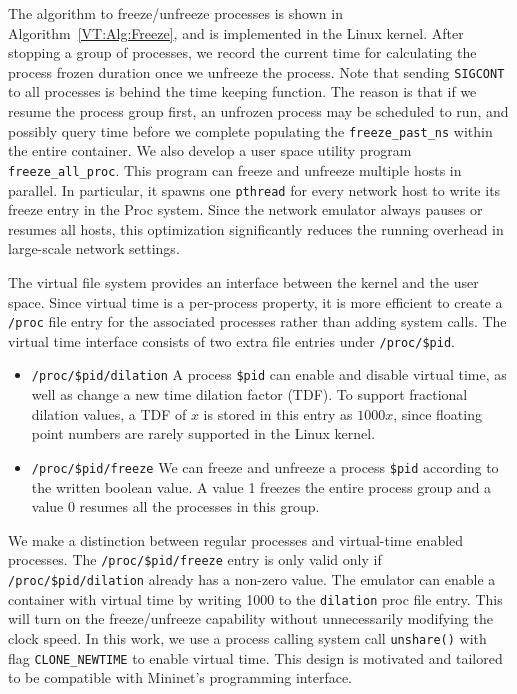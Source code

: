 The algorithm to freeze/unfreeze processes is shown in Algorithm~\ref{VT:Alg:Freeze},
and is implemented in the Linux kernel.
After stopping a group of processes, we record the  current time for calculating the process frozen duration once we unfreeze the process.
Note that sending \texttt{SIGCONT} to all processes is behind the time keeping function.
The reason is that if we resume the process group first, an unfrozen process may be scheduled to run,
and possibly query time before we complete populating the \texttt{freeze\_past\_ns} within the entire container.
We also develop a user space utility program \texttt{freeze\_all\_proc}.
This program can freeze and unfreeze multiple hosts in parallel.
In particular, it spawns one \texttt{pthread} for every network host to write its freeze entry in the Proc system.
Since the network emulator always pauses or resumes all hosts, this optimization significantly reduces the running overhead in large-scale network settings.

The virtual file system provides an interface between the kernel and the user space.
Since virtual time is a per-process property, it is more efficient to create a \texttt{/proc}
file entry for the associated processes rather than adding system calls.
The virtual time interface consists of two extra file entries under \texttt{/proc/\$pid}.
\begin{itemize}
    \item \texttt{/proc/\$pid/dilation} A process \texttt{\$pid} can enable and disable virtual time, as well as change a new time dilation factor (TDF).
        To support fractional dilation values, a TDF of $x$ is stored in this entry as $1000x$,  since floating point numbers are rarely supported in the Linux kernel.
    \item \texttt{/proc/\$pid/freeze} We can freeze and unfreeze a process \texttt{\$pid} according to the written boolean value.
        A value 1 freezes the entire process group and a value 0 resumes all the processes in this group.
\end{itemize}

We make a distinction between regular processes and virtual-time enabled processes.
The \texttt{/proc/\$pid/freeze} entry is only valid only if \texttt{/proc/\$pid/dilation} already has a non-zero value.
The emulator can enable a container with virtual time by writing 1000 to the \texttt{dilation} proc file entry.
This will turn on the freeze/unfreeze capability without unnecessarily modifying the clock speed.
In this work, we use a process calling system call \texttt{unshare()} with flag \texttt{CLONE\_NEWTIME} to enable virtual time.
This design is motivated and tailored to be compatible with Mininet's programming interface.


